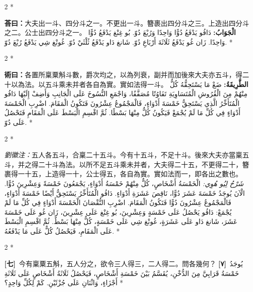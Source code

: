 \documentclass[11pt,a4paper]{article}
\newcommand{\ar}[1]{\arabicfont\beginR #1\endR}
\newcommand{\problemnum}[1]{\textbf{[\ignorespaces#1\unskip]}}
\newenvironment{bilingual}{%
  \begin{paracol}{2}%
  \switchcolumn[0]*%
}{%
  \end{paracol}%
}
\newcommand{\cnline}[1]{\switchcolumn[0]\noindent #1 \switchcolumn[1]}
\newcommand{\arline}[1]{\noindent\ar{#1} \switchcolumn[0]*}
\newenvironment{prob bilingual}{%
  \begin{paracol}{2}%
  \switchcolumn[0]*%
}{%
  \end{paracol}%
  \vspace{0.3em}%
}
\begin{document}
\begin{bilingual}
\cnline{\textcolor{answercolor}{\textbf{荅曰：}}大夫出一斗、四分斗之一。不更出一斗。簪裹出四分斗之三。上造出四分斗之二。公士出四分斗之一。}
\arline{\textcolor{answercolor}{\textbf{الْجَوَابُ:}} دَافُو يَدْفَعُ دُوًّا وَاحِدًا وَرُبْعَ دُوّ. بُو غِنْغ يَدْفَعُ دُوًّا وَاحِدًا. زَان غُو يَدْفَعُ ثَلَاثَةَ أَرْبَاعِ دُوّ. شَانغ دَاو يَدْفَعُ ثُلْثَيْ دُوّ. غُونْغ شِي يَدْفَعُ رُبْعَ دُوّ.}
\end{bilingual}

\begin{bilingual}
\cnline{%
\textcolor{methodcolor}{\textbf{術曰：}}各置所稟粟斛斗數，爵次均之，以為列衰，副并而加後來大夫亦五斗，得二十以為法。以五斗乘未并者各自為實。實如法得一斗。
}
\arline{%
\textcolor{methodcolor}{\textbf{الطَّرِيقَةُ:}} ضَعْ مَا يَسْتَحِقُّهُ كُلٌّ مِنْهُمْ مِنَ الْقُرُوشِ الْمُتَسَاوِيَةِ تَفَاوُتًا مُصَفَّفًا، وَاجْمَعِ النُّسُوخَ عَلَى الْجَانِبِ وَأَضِفْ إِلَيْهَا دَافُو الْمُتَأَخِّرُ الَّذِي يَسْتَحِقُّ خَمْسَةَ أَدْوَاءٍ، فَالْمَجْمُوعُ عِشْرُونَ فَتَكُونُ الْمَقَامَ. اضْرِبِ الْخَمْسَةَ أَدْوَاءٍ فِي كُلِّ مَا لَمْ يُجْمَعْ فَيَكُونُ كُلٌّ مِنْهَا بَسْطًا. ثُمَّ اقْسِمِ الْبَسْطَ عَلَى الْمَقَامِ فَتَحْصُلُ عَلَى دُوّ.
}
\end{bilingual}

\begin{bilingual}
\cnline{%
\textcolor{commentarycolor}{\small\textit{劉徽注：}}五人各五斗，合稟二十五斗。今有十五斗，不足十斗。後來大夫亦當稟五斗，并之得二十斗為法。以所不足五斗乘未并者，大夫得二十五，不更得二十，簪裹得一十五，上造得一十，公士得五，各自為實。實如法而一，即各出之數也。
}
\arline{%
\textcolor{commentarycolor}{\small\textit{شَرْحُ لِيُو هُوِي:}} الْخَمْسَةُ أَشْخَاصٍ، كُلٌّ مِنْهُمْ خَمْسَةُ أَدْوَاءٍ، يَجْمَعُونَ خَمْسَةً وَعِشْرِينَ دُوًّا. الْآنَ يُوجَدُ خَمْسَةَ عَشَرَ دُوًّا، نَاقِصَ عَشَرَةِ أَدْوَاءٍ. دَافُو الْمُتَأَخِّرُ يَسْتَحِقُّ أَيْضًا خَمْسَةَ أَدْوَاءٍ، فَالْمَجْمُوعُ عِشْرُونَ دُوًّا فَتَكُونُ الْمَقَامَ. اضْرِبِ النُّقْصَانَ الْخَمْسَةَ أَدْوَاءٍ فِي كُلِّ مَا لَمْ يُجْمَعْ: دَافُو يَحْصُلُ عَلَى خَمْسَةٍ وَعِشْرِينَ، بُو غِنْغ عَلَى عِشْرِينَ، زَان غُو عَلَى خَمْسَةَ عَشَرَ، شَانغ دَاو عَلَى عَشَرَةٍ، غُونْغ شِي عَلَى خَمْسَةٍ، كُلٌّ مِنْهَا بَسْطٌ. ثُمَّ اقْسِمِ الْبَسْطَ عَلَى الْمَقَامِ، فَيَحْصُلُ كُلٌّ عَلَى مَا يَدْفَعُهُ.
}
\end{bilingual}

\begin{bilingual}
\cnline{\problemnum{七}\, 今有稟粟五斛，五人分之，欲令三人得三，二人得二。問各幾何？}
\arline{\problemnum{٧}\, يُوجَدُ خَمْسَةُ قَرَابِيَّ مِنَ الدُّخْنِ، يُقَسَّمُ بَيْنَ خَمْسَةِ أَشْخَاصٍ، فَيَحْصُلُ ثَلَاثَةُ أَشْخَاصٍ عَلَى ثَلَاثَةِ أَجْزَاءٍ، وَاثْنَانِ عَلَى جُزْئَيْنِ. كَمْ لِكُلِّ وَاحِدٍ؟}
\end{bilingual}
\end{document}
